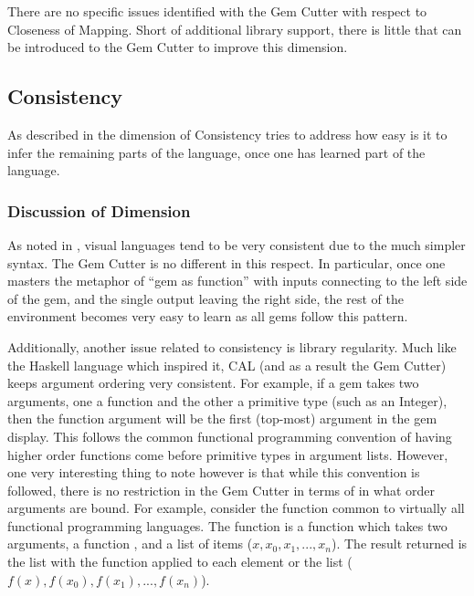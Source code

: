 There are no specific issues identified with the Gem Cutter with respect to Closeness of Mapping.  Short of additional library support, there is little that can be introduced to the Gem Cutter to improve this dimension.


\subsection{Consistency}

As described in  the dimension of Consistency tries to address how easy is it to infer the remaining parts of the language, once one has learned part of the language.

\subsubsection{Discussion of Dimension}

As noted in , visual languages tend to be very consistent due to the much simpler syntax.  The Gem Cutter is no different in this respect.  In particular, once one masters the metaphor of ``gem as function'' with inputs connecting to the left side of the gem, and the single output leaving the right side, the rest of the environment becomes very easy to learn as all gems follow this pattern.

Additionally, another issue related to consistency is library regularity.  Much like the Haskell language which inspired it, CAL (and as a result the Gem Cutter) keeps argument ordering very consistent.  For example, if a gem takes two arguments, one a function and the other a primitive type (such as an Integer), then the function argument will be the first (top-most) argument in the gem display.  This follows the common functional programming convention of having higher order functions come before primitive types in argument lists.  However, one very interesting thing to note however is that while this convention is followed, there is no restriction in the Gem Cutter in terms of in what order arguments are bound.  For example, consider the  function common to virtually all functional programming languages.  The  function is a function which takes two arguments, a function , and a list of items (\(x,x_0,x_1,...,x_n\)).  The result returned is the list with the function applied to each element or the list (\(f(x),f(x_0),f(x_1),...,f(x_n)\)).

